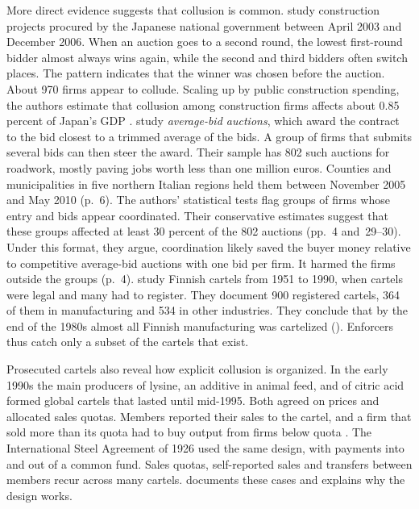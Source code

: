 More direct evidence suggests that collusion is common. \citet{KawaiNakabayashi2020} study construction projects
procured by the Japanese national government between April 2003 and December 2006. When an auction goes to a second
round, the lowest first-round bidder almost always wins again, while the second and third bidders often switch
places. The pattern indicates that the winner was chosen before the auction. About 970 firms appear to collude.
Scaling up by public construction spending, the authors estimate that collusion among construction firms affects
about 0.85 percent of Japan's GDP \citep[pp.~184--185]{AskerNocke2021}. \citet{ConleyDecarolis2016} study
\emph{average-bid auctions}, which award the contract to the bid closest to a trimmed average of the bids. A group of
firms that submits several bids can then steer the award. Their sample has 802 such auctions for roadwork, mostly
paving jobs worth less than one million euros. Counties and municipalities in five northern Italian regions held them
between November 2005 and May 2010 (p.~6). The authors' statistical tests flag groups of firms whose entry and
bids appear coordinated. Their conservative estimates suggest that these groups affected at least 30 percent of the 802
auctions (pp.~4 and~29--30). Under this format, they argue, coordination likely saved the buyer money relative to
competitive average-bid auctions with one bid per firm. It harmed the firms outside the groups (p.~4).
\citet{HyytinenSteenToivanen2018} study Finnish cartels from 1951 to 1990,
when cartels were legal and many had to register. They document 900 registered cartels, 364 of them in manufacturing
and 534 in other industries. They conclude that by the end of the 1980s almost all Finnish manufacturing was
cartelized (\citealp[p.~186]{AskerNocke2021}).
Enforcers thus catch only a subset of the cartels that exist.

Prosecuted cartels also reveal how explicit collusion is organized. In the early 1990s the main producers of lysine,
an additive in animal feed, and of citric acid formed global cartels that lasted until mid-1995. Both agreed on
prices and allocated sales quotas. Members reported their sales to the cartel, and a firm that sold more than its
quota had to buy output from firms below quota \citep[pp.~2425--2426]{HarringtonSkrzypacz2011}. The International
Steel Agreement of 1926 used the same design, with payments into and out of a common fund. Sales quotas,
self-reported sales and transfers between members recur across many cartels.  documents these cases
and explains why the design works.

